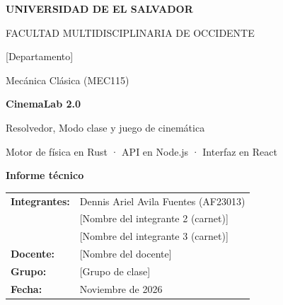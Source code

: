 \documentclass[11pt,letterpaper]{article}
\newcommand{\pend}[1]{\textcolor{orange!80!black}{[#1]}}
\begin{document}
\begin{titlepage}
\centering
\vspace*{0.4cm}
{\large\bfseries UNIVERSIDAD DE EL SALVADOR\par}
\vspace{2pt}
{\large FACULTAD MULTIDISCIPLINARIA DE OCCIDENTE\par}
\vspace{2pt}
{\normalsize \pend{Departamento}\par}
\vspace{1.4cm}
{\large Mecánica Clásica (MEC115)\par}
\vspace{1.4cm}
\par\vspace{0.8cm}
{\fontsize{30}{36}\selectfont\bfseries\color{azul} CinemaLab 2.0\par}
\vspace{6pt}
{\Large Resolvedor, Modo clase y juego de cinemática\par}
\vspace{4pt}
{\large Motor de física en Rust · API en Node.js · Interfaz en React\par}
\vspace{1.2cm}
{\large\bfseries Informe técnico\par}
\vfill
\begin{tabular}{ll}
\textbf{Integrantes:} & Dennis Ariel Avila Fuentes (AF23013) \\
 & \pend{Nombre del integrante 2 (carnet)} \\
 & \pend{Nombre del integrante 3 (carnet)} \\[6pt]
\textbf{Docente:} & \pend{Nombre del docente} \\
\textbf{Grupo:} & \pend{Grupo de clase} \\
\textbf{Fecha:} & Noviembre de 2026 \\
\end{tabular}
\vspace{1cm}
\end{titlepage}
\end{document}
